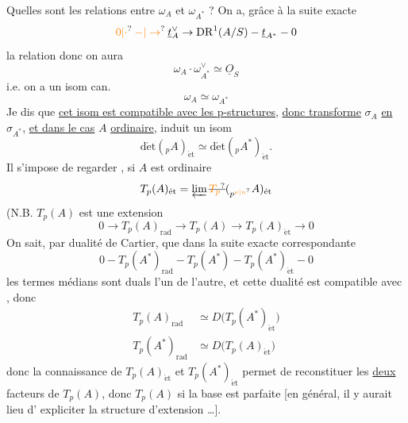 Quelles sont les relations entre $\omega_A$ et $\omega_{A^*}$ ? On
a, grâce à la suite exacte
\[
\unsure{0|\cdot}\mathbin{\unsure{-|\to}}\underline t_A^\vee\to\mathrm{DR}^1(A/S)\mathbin{-}\underline t_{A^*}\mathbin{-}0
\]
la relation
donc on aura
\[
\omega_A\cdot\omega_{A^*}^\vee\simeq\underline O_S
\]
i.e. on a un isom can.
\[
\omega_A\simeq\omega_{A^*}
\]
Je dis que \uline{cet isom est compatible avec les
p-structures},  \uline{donc transforme} $\sigma_A$ \uline{en} $\sigma_{A^*}$, \uline{et
dans le cas} $A$ \uline{ordinaire}, induit un isom
\[
\operatorname{d\acute et}({}_pA)_{\mathrm{\acute et}}\simeq\operatorname{d\acute et}({}_p A^*)_{\mathrm{\acute et}} .
\]
Il s'impose de regarder , si $A$ est ordinaire
\[
T_p(A)_{\mathrm{\acute et}}=\varprojlim\deleted{\unsure{T_p}}({}_{p^{\unsure{\nu|n}}}A)_{\mathrm{\acute et}}
\]
(N.B. $T_p(A)$ est une extension
\[
0\to T_p(A)_{\mathrm{rad}}\to T_p(A)\mathbin{\to}T_p(A)_{\mathrm{\acute et}}\to0
\]
On sait, par dualité de Cartier, que dans la
suite exacte correspondante
\[
0\mathbin{-}T_p(A^*)_{\mathrm{rad}}\mathbin{-}T_p(A^*)\mathbin{-}T_p(A^*)_{\mathrm{\acute et}}\mathbin{-}0
\]
les termes médians sont duals l'un de
l'autre, et  cette dualité est
compatible avec , donc
\[
\begin{aligned}
T_p(A)_{\mathrm{rad}}&\simeq D\bigl(T_p(A^*)_{\mathrm{\acute et}}\bigr)\\
T_p(A^*)_{\mathrm{rad}}&\simeq D\bigl(T_p(A)_{\mathrm{\acute et}}\bigr)
\end{aligned}
\]
donc la connaissance de $T_p(A)_{\mathrm{\acute et}}$ et $T_p(A^*)_{\mathrm{\acute et}}$
permet de reconstituer les \uline{deux} facteurs
de $T_p(A)$, donc $T_p(A)$ si la base est
parfaite [en général, il y aurait lieu d'
expliciter la structure d'extension \ldots].

